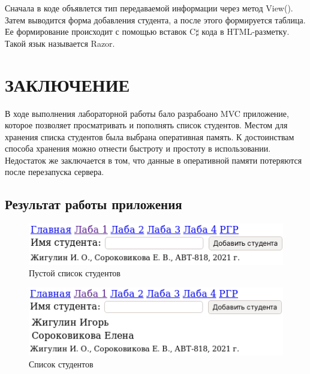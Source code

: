 \documentclass[a4paper,14pt]{extreport}
\begin{document}
Сначала в коде объявлется тип передаваемой информации через метод View(). Затем выводится форма добавления студента, а после этого формируется таблица. Ее формирование происходит с помощью вставок C$\sharp$ кода в HTML-разметку. Такой язык называется Razor.

\chapter{ЗАКЛЮЧЕНИЕ}
В ходе выполнения лабораторной работы бало разрабоано MVC приложение, которое позволяет просматривать и пополнять список студентов. Местом для хранения списка студентов была выбрана оперативная память. К достоинствам способа хранения можно отнести быстроту и простоту в использовании. Недостаток же заключается в том, что данные в оперативной памяти потеряются после перезапуска сервера.

\section{Результат работы приложения}

\begin{figure}[H]
	\centering
	\includegraphics{before}
	\caption{Пустой список студентов}
\end{figure}

\begin{figure}[H]
	\centering
	\includegraphics{after}
	\caption{Список студентов}
\end{figure}
\end{document}

